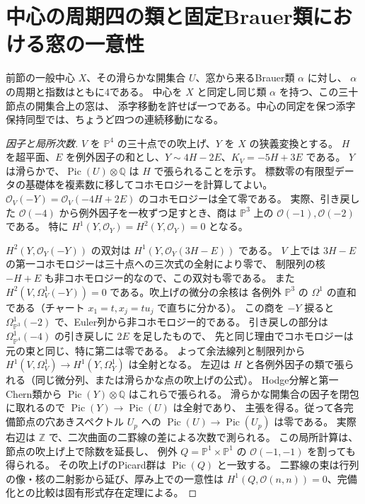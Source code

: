 \section{中心の周期四の類と固定Brauer類における窓の一意性}
\label{sec:thirty-node-brauer-windows}
\begin{theorem}\label{thm:fixed-brauer-center-windows}
前節の一般中心 $X$、その滑らかな開集合 $U$、窓から来るBrauer類 $\alpha$ に対し、
$\alpha$ の周期と指数はともに4である。
中心を $X$ と同定し同じ類 $\alpha$ を持つ、この三十節点の開集合上の窓は、
添字移動を許せば一つである。中心の同定を保つ添字保持同型では、ちょうど四つの連続移動になる。
\end{theorem}
\begin{proof}[因子と局所次数]
$V$ を $\mathbb P^4$ の三十点での吹上げ、$Y$ を $X$ の狭義変換とする。
$H$ を超平面、$E$ を例外因子の和とし、$Y\sim4H-2E$、$K_V=-5H+3E$ である。
$Y$ は滑らかで、$\operatorname{Pic}(U)\otimes\mathbb Q$ は $H$ で張られることを示す。
標数零の有限型データの基礎体を複素数に移してコホモロジーを計算してよい。
$\mathcal O_V(-Y)=\mathcal O_V(-4H+2E)$ のコホモロジーは全て零である。
実際、引き戻した $\mathcal O(-4)$ から例外因子を一枚ずつ足すとき、商は
$\mathbb P^3$ 上の $\mathcal O(-1),\mathcal O(-2)$ である。
特に $H^1(Y,\mathcal O_Y)=H^2(Y,\mathcal O_Y)=0$ となる。

$H^2(Y,\mathcal O_Y(-Y))$ の双対は $H^1(Y,\mathcal O_Y(3H-E))$ である。
$V$ 上では $3H-E$ の第一コホモロジーは三十点への三次式の全射により零で、
制限列の核 $-H+E$ も非コホモロジー的なので、この双対も零である。
また $H^2(V,\Omega_V^1(-Y))=0$ である。吹上げの微分の余核は
各例外 $\mathbb P^3$ の $\Omega^1$ の直和である（チャート $x_1=t,x_j=tu_j$ で直ちに分かる）。
この商を $-Y$ 捩ると $\Omega^1_{\mathbb P^3}(-2)$ で、Euler列から非コホモロジー的である。
引き戻しの部分は $\Omega^1_{\mathbb P^4}(-4)$ の引き戻しに $2E$ を足したもので、
先と同じ理由でコホモロジーは元の束と同じ、特に第二は零である。
よって余法線列と制限列から $H^1(V,\Omega^1_V)\to H^1(Y,\Omega^1_Y)$ は全射となる。
左辺は $H$ と各例外因子の類で張られる（同じ微分列、または滑らかな点の吹上げの公式）。
Hodge分解と第一Chern類から $\operatorname{Pic}(Y)\otimes\mathbb Q$ はこれらで張られる。
滑らかな開集合の因子を閉包に取れるので $\operatorname{Pic}(Y)\to\operatorname{Pic}(U)$ は全射であり、
主張を得る。従って各完備節点の穴あきスペクトル $U_p$ への
$\operatorname{Pic}(U)\to\operatorname{Pic}(U_p)$ は零である。
実際右辺は $\mathbb Z$ で、二次曲面の二罫線の差による次数で測られる。
この局所計算は、節点の吹上げ上で除数を延長し、
例外 $Q=\mathbb P^1\times\mathbb P^1$ の $\mathcal O(-1,-1)$ を割っても得られる。
その吹上げのPicard群は $\operatorname{Pic}(Q)$ と一致する。
二罫線の束は行列の像・核の二射影から延び、厚み上での一意性は
$H^1(Q,\mathcal O(n,n))=0$、完備化との比較は固有形式存在定理による。


\end{proof}
